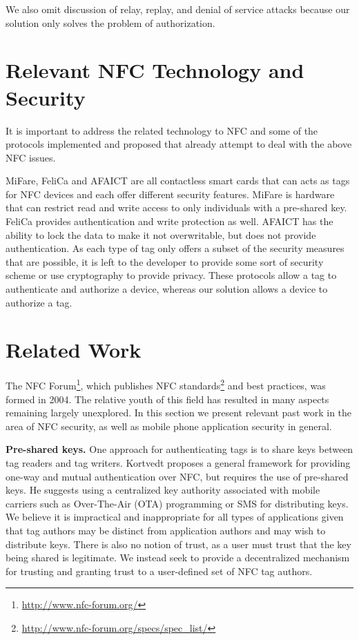 \documentclass[12pt]{article}
\begin{document}
We also omit discussion of relay, replay, and denial of service attacks because our solution only solves the problem of authorization.

\section{Relevant NFC Technology and Security}
It is important to address the related technology to NFC and some of the protocols implemented and proposed that already attempt to deal with the above NFC issues. 

MiFare, FeliCa and AFAICT are all contactless smart cards that can acts as tags for NFC devices and each offer different security features.
MiFare is hardware that can restrict read and write access to only individuals with a pre-shared key.
FeliCa provides authentication and write protection as well.
AFAICT has the ability to lock the data to make it not overwritable, but does not provide authentication.
As each type of tag only offers a subset of the security measures that are possible, it is left to the developer to provide some sort of security scheme or use cryptography to provide privacy. 
These protocols allow a tag to authenticate and authorize a device, whereas our solution allows a device to authorize a tag.


\section{Related Work}
The NFC Forum\footnote{\url{http://www.nfc-forum.org/}}, which publishes NFC standards\footnote{\url{http://www.nfc-forum.org/specs/spec_list/}} and best practices, was formed in 2004.
The relative youth of this field has resulted in many aspects remaining largely unexplored.
In this section we present relevant past work in the area of NFC security, as well as mobile phone application security in general.

\textbf{Pre-shared keys.}
One approach for authenticating tags is to share keys between tag readers and tag writers.
Kortvedt \cite{kortvedt2009} proposes a general framework for providing one-way and mutual authentication over NFC, but requires the use of pre-shared keys.
He suggests using a centralized key authority associated with mobile carriers such as Over-The-Air (OTA) programming or SMS for distributing keys.
We believe it is impractical and inappropriate for all types of applications given that tag authors may be distinct from application authors and may wish to distribute keys.
There is also no notion of trust, as a user must trust that the key being shared is legitimate.
We instead seek to provide a decentralized mechanism for trusting and granting trust to a user-defined set of NFC tag authors.
\end{document}

